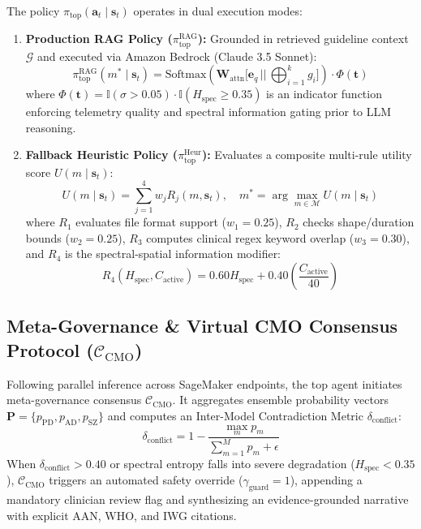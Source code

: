 \documentclass[runningheads]{llncs}
\begin{document}
The policy $\pi_{\text{top}}(\mathbf{a}_t \mid \mathbf{s}_t)$ operates in dual execution modes:
\begin{enumerate}
    \item \textbf{Production RAG Policy ($\pi_{\text{top}}^{\text{RAG}}$):} Grounded in retrieved guideline context $\mathcal{G}$ and executed via Amazon Bedrock (Claude 3.5 Sonnet):
    \begin{equation}
    \pi_{\text{top}}^{\text{RAG}}(m^* \mid \mathbf{s}_t) = \text{Softmax}\left( \mathbf{W}_{\text{attn}} \Big[ \mathbf{e}_q \,||\, \bigoplus_{i=1}^k g_i \Big] \right) \cdot \Phi(\mathbf{t})
    \end{equation}
    where $\Phi(\mathbf{t}) = \mathbb{I}(\sigma > 0.05) \cdot \mathbb{I}(H_{\text{spec}} \ge 0.35)$ is an indicator function enforcing telemetry quality and spectral information gating prior to LLM reasoning.
    \item \textbf{Fallback Heuristic Policy ($\pi_{\text{top}}^{\text{Heur}}$):} Evaluates a composite multi-rule utility score $U(m \mid \mathbf{s}_t)$:
    \begin{equation}
    U(m \mid \mathbf{s}_t) = \sum_{j=1}^4 w_j R_j(m, \mathbf{s}_t), \quad m^* = \arg\max_{m \in \mathcal{M}} U(m \mid \mathbf{s}_t)
    \end{equation}
    where $R_1$ evaluates file format support ($w_1=0.25$), $R_2$ checks shape/duration bounds ($w_2=0.25$), $R_3$ computes clinical regex keyword overlap ($w_3=0.30$), and $R_4$ is the spectral-spatial information modifier:
    \begin{equation}
    R_4(H_{\text{spec}}, C_{\text{active}}) = 0.60 H_{\text{spec}} + 0.40 \left( \frac{C_{\text{active}}}{40} \right)
    \end{equation}
\end{enumerate}

\subsection{Meta-Governance \& Virtual CMO Consensus Protocol ($\mathcal{C}_{\text{CMO}}$)}
Following parallel inference across SageMaker endpoints, the top agent initiates meta-governance consensus $\mathcal{C}_{\text{CMO}}$. It aggregates ensemble probability vectors $\mathbf{P} = \{p_{\text{PD}}, p_{\text{AD}}, p_{\text{SZ}}\}$ and computes an Inter-Model Contradiction Metric $\delta_{\text{conflict}}$:
\begin{equation}
\delta_{\text{conflict}} = 1 - \frac{\max_{m} p_m}{\sum_{m=1}^{M} p_m + \epsilon}
\end{equation}
When $\delta_{\text{conflict}} > 0.40$ or spectral entropy falls into severe degradation ($H_{\text{spec}} < 0.35$), $\mathcal{C}_{\text{CMO}}$ triggers an automated safety override ($\gamma_{\text{guard}} = 1$), appending a mandatory clinician review flag and synthesizing an evidence-grounded narrative with explicit AAN, WHO, and IWG citations.
\end{document}
